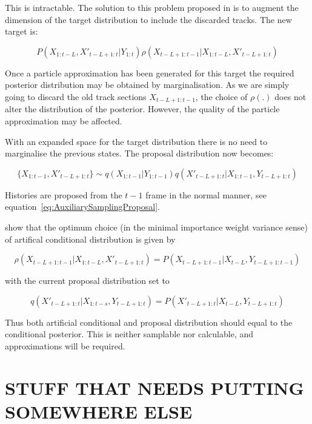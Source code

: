 This is intractable. The solution to this problem proposed in \cite{Doucet2006} is to augment the dimension of the target distribution to include the discarded tracks. The new target is:

\begin{equation}
P(X_{1:t-L}, X'_{t-L+1:t}|Y_{1:t}) \rho(X_{t-L+1:t-1}|X_{1:t-L}, X'_{t-L+1:t})
\label{eq:FLTarget}
\end{equation}

Once a particle approximation has been generated for this target the required posterior distribution may be obtained by marginalisation. As we are simply going to discard the old track sections $X_{t-L+1:t-1}$, the choice of $\rho(.)$ does not alter the distribution of the posterior. However, the quality of the particle approximation may be affected.

With an expanded space for the target distribution there is no need to marginalise the previous states. The proposal distribution now becomes:

\begin{equation}
\{X_{1:t-1}, X'_{t-L+1:t}\} \sim q(X_{1:t-1}|Y_{1:t-1}) q(X'_{t-L+1:t}|X_{1:t-1}, Y_{t-L+1:t})
\label{eq:ExtendedFLProposal}
\end{equation}

Histories are proposed from the $t-1$ frame in the normal manner, see equation~\ref{eq:AuxiliarySamplingProposal}.

\cite{Doucet2006} show that the optimum choice (in the minimal importance weight variance sense) of artifical conditional distribution is given by 

\begin{equation}
\rho(X_{t-L+1:t-1}|X_{1:t-L}, X'_{t-L+1:t}) = P(X_{t-L+1:t-1}|X_{t-L}, Y_{t-L+1:t-1})
\label{eq:}
\end{equation}

with the current proposal distribution set to

\begin{equation}
q(X'_{t-L+1:t}|X_{1:t-s}, Y_{t-L+1:t}) = P(X'_{t-L+1:t}|X_{t-L}, Y_{t-L+1:t})
\label{eq:}
\end{equation}

Thus both artificial conditional and proposal distribution should equal to the conditional posterior. This is neither samplable nor calculable, and approximations will be required.



\section{STUFF THAT NEEDS PUTTING SOMEWHERE ELSE}

